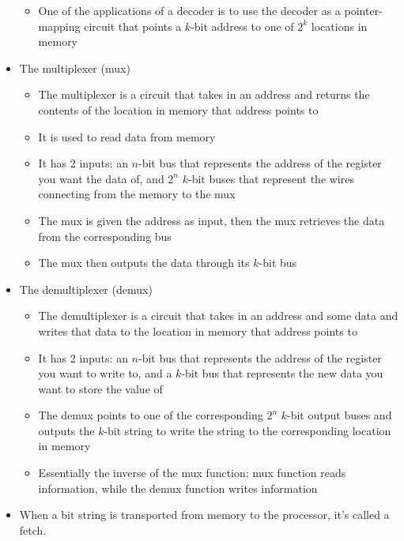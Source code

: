 \documentclass{article}
\begin{document}
\begin{itemize}
\begin{itemize}
			\item One of the applications of a decoder is to use the decoder as a pointer-mapping circuit that points a $k$-bit address to one of $2^k$ locations in memory
		\end{itemize}
	\item The multiplexer (mux)
		\begin{itemize}
			\item The multiplexer is a circuit that takes in an address and returns the contents of the location in memory that address points to
			\item It is used to read data from memory
			\item It has 2 inputs: an $n$-bit bus that represents the address of the register you want the data of, and $2^n$ $k$-bit buses that represent the wires connecting from the memory to the mux
			\item The mux is given the address as input, then the mux retrieves the data from the corresponding bus
			\item The mux then outputs the data through its $k$-bit bus
		\end{itemize}
	\item The demultiplexer (demux)
		\begin{itemize}
			\item The demultiplexer is a circuit that takes in an address and some data and writes that data to the location in memory that address points to
			\item It has 2 inputs: an $n$-bit bus that represents the address of the register you want to write to, and a $k$-bit bus that represents the new data you want to store the value of
			\item The demux points to one of the corresponding $2^n$ $k$-bit output buses and outputs the $k$-bit string to write the string to the corresponding location in memory
			\item Essentially the inverse of the mux function; mux function reads information, while the demux function writes information
		\end{itemize}
	\item When a bit string is transported from memory to the processor, it's called a fetch.
\end{itemize}
\end{document}
